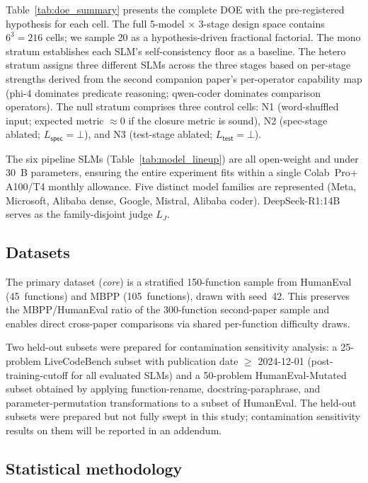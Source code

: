 



Table~\ref{tab:doe_summary} presents the complete DOE with the pre-registered hypothesis for each cell. The full 5-model $\times$ 3-stage design space contains $6^3 = 216$ cells; we sample 20 as a hypothesis-driven fractional factorial. The mono stratum establishes each SLM's self-consistency floor as a baseline. The hetero stratum assigns three different SLMs across the three stages based on per-stage strengths derived from the second companion paper's per-operator capability map (phi-4 dominates predicate reasoning; qwen-coder dominates comparison operators). The null stratum comprises three control cells: N1 (word-shuffled input; expected metric $\approx 0$ if the closure metric is sound), N2 (spec-stage ablated; $L_{\textsf{spec}} = \bot$), and N3 (test-stage ablated; $L_{\textsf{test}} = \bot$).

The six pipeline SLMs (Table~\ref{tab:model_lineup}) are all open-weight and under 30~B parameters, ensuring the entire experiment fits within a single Colab~Pro+ A100/T4 monthly allowance. Five distinct model families are represented (Meta, Microsoft, Alibaba dense, Google, Mistral, Alibaba coder). DeepSeek-R1:14B serves as the family-disjoint judge $L_J$.

\subsection{Datasets}

The primary dataset (\emph{core}) is a stratified 150-function sample from HumanEval (45~functions) and MBPP (105~functions), drawn with seed~42. This preserves the MBPP/HumanEval ratio of the 300-function second-paper sample and enables direct cross-paper comparisons via shared per-function difficulty draws.

Two held-out subsets were prepared for contamination sensitivity analysis: a 25-problem LiveCodeBench subset with publication date $\geq$ 2024-12-01 (post-training-cutoff for all evaluated SLMs) and a 50-problem HumanEval-Mutated subset obtained by applying function-rename, docstring-paraphrase, and parameter-permutation transformations to a subset of HumanEval. The held-out subsets were prepared but not fully swept in this study; contamination sensitivity results on them will be reported in an addendum.

\subsection{Statistical methodology}

